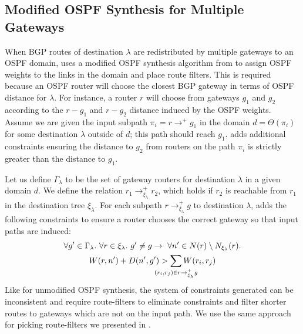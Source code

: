 \subsection{Modified OSPF Synthesis for Multiple Gateways}
When BGP routes of destination $\lambda$ 
are redistributed by multiple gateways to an 
OSPF domain, \name uses a modified OSPF synthesis
algorithm from  to assign OSPF weights to the links in the domain
and place route filters. 
This is 
required because an OSPF router will choose
the closest BGP gateway in terms of OSPF distance 
for $\lambda$. For instance, a router $r$ will choose
from gateways $g_1$ and $g_2$ according to the $r-g_1$
and $r-g_2$ distance induced by the OSPF weights. 
Assume we are given the input subpath $\pi_i=r \rightarrow^+ g_1$ in
the domain $d=\Theta(\pi_i)$ for some destination $\lambda$ outside
of $d$; this path should reach $g_1$. 
\name adds additional
constraints ensuring the distance to $g_2$ from routers
on the path $\pi_i$ is strictly
greater than the distance to $g_1$. 

Let us define $\Gamma_\lambda$ to be the set of gateway
routers for destination $\lambda$ in a given domain $d$. 
We define the relation $r_1 \rightarrow^+_{\xi_{\lambda}} r_2$, which holds if
$r_2$ is reachable from $r_1$ in the destination tree $\xi_\lambda$.
For each subpath $r \rightarrow^+_{\xi_{\lambda}} g$ to destination $\lambda$,
\name adds the following constraints 
to ensure a router
chooses the correct gateway so that input 
paths are induced: 
\begin{multline} \label{eq:gateway}
\forall g' \in \Gamma_{\lambda}.~\forall r \in \xi_\lambda.~
g' \not= g
\rightarrow
~\forall n' \in N(r) \setminus N_{\xi_\lambda}(r). \\
W(r, n') + D(n', g') > \sum_{\mathclap{\substack{(r_i,r_j) \in r \rightarrow^+_{\xi_{\lambda}} g }}} 
W(r_i, r_j) 
\end{multline}
Like for unmodified OSPF synthesis, the system of
constraints generated can be inconsistent and require
route-filters to eliminate constraints
and  filter shorter routes to gateways which are
not on the input path.
We use the same 
approach for picking route-filters we presented in
. 
